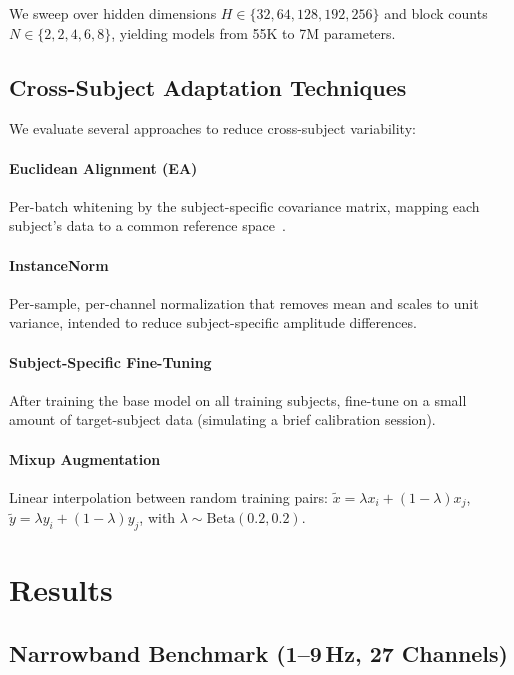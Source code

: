 \documentclass[conference]{IEEEtran}
\begin{document}
We sweep over hidden dimensions $H \in \{32, 64, 128, 192, 256\}$ and block counts $N \in \{2, 2, 4, 6, 8\}$, yielding models from 55K to 7M parameters.

\subsection{Cross-Subject Adaptation Techniques}

We evaluate several approaches to reduce cross-subject variability:

\paragraph{Euclidean Alignment (EA)} Per-batch whitening by the subject-specific covariance matrix, mapping each subject's data to a common reference space~\cite{he2020euclidean}.

\paragraph{InstanceNorm} Per-sample, per-channel normalization that removes mean and scales to unit variance, intended to reduce subject-specific amplitude differences.

\paragraph{Subject-Specific Fine-Tuning} After training the base model on all training subjects, fine-tune on a small amount of target-subject data (simulating a brief calibration session).

\paragraph{Mixup Augmentation} Linear interpolation between random training pairs: $\tilde{x} = \lambda x_i + (1-\lambda) x_j$, $\tilde{y} = \lambda y_i + (1-\lambda) y_j$, with $\lambda \sim \text{Beta}(0.2, 0.2)$.

\section{Results}
\label{sec:results}

\subsection{Narrowband Benchmark (1--9\,Hz, 27 Channels)}
\end{document}
